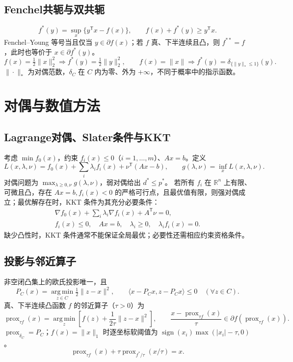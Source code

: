 \documentclass[../main.tex]{subfiles}
\begin{document}
\subsection{Fenchel共轭与双共轭}
\[
f^*(y)=\sup_x\{y^{\mathsf T}x-f(x)\},\qquad
f(x)+f^*(y)\ge y^{\mathsf T}x.
\]
Fenchel--Young 等号当且仅当 $y\in\partial f(x)$；若 $f$ 真、下半连续且凸，则 $f^{**}=f$，此时也等价于 $x\in\partial f^*(y)$。
\[
f(x)=\tfrac12\|x\|_2^2\Longrightarrow f^*(y)=\tfrac12\|y\|_2^2,\qquad
f(x)=\|x\|\Longrightarrow f^*(y)=\delta_{\{\|y\|_*\le1\}}(y).
\]
$\|\cdot\|_*$ 为对偶范数，$\delta_C$ 在 $C$ 内为零、外为 $+\infty$，不同于概率中的指示函数。
\section{对偶与数值方法}
\subsection{Lagrange对偶、Slater条件与KKT}
考虑 $\min f_0(x)$，约束 $f_i(x)\le0$（$i=1,\ldots,m$）、$Ax=b$。定义
\[
L(x,\lambda,\nu)=f_0(x)+\sum_i\lambda_if_i(x)+\nu^{\mathsf T}(Ax-b),\qquad
g(\lambda,\nu)=\inf_x L(x,\lambda,\nu).
\]
对偶问题为 $\max_{\lambda\ge0,\nu}g(\lambda,\nu)$，弱对偶给出 $d^*\le p^*$。
若所有 $f_i$ 在 $\mathbb R^n$ 上有限、可微且凸，存在 $Ax=b,f_i(x)<0$ 的严格可行点，且最优值有限，则强对偶成立；最优解存在时，KKT 条件为其充分必要条件：
\begin{gather*}
\nabla f_0(x)+\sum_i\lambda_i\nabla f_i(x)+A^{\mathsf T}\nu=0,\\
f_i(x)\le0,\quad Ax=b,\quad\lambda_i\ge0,\quad\lambda_if_i(x)=0.
\end{gather*}
缺少凸性时，KKT 条件通常不能保证全局最优；必要性还需相应约束资格条件。
\subsection{投影与邻近算子}
非空闭凸集上的欧氏投影唯一，且
\[
P_C(x)=\operatorname*{arg\,min}_{z\in C}\tfrac12\|z-x\|^2,\qquad
\langle x-P_Cx,z-P_Cx\rangle\le0\quad(\forall z\in C).
\]
真、下半连续凸函数 $f$ 的邻近算子（$\tau>0$）为
\[
\operatorname{prox}_{\tau f}(x)=\operatorname*{arg\,min}_z
\left[f(z)+\frac1{2\tau}\|z-x\|^2\right],\qquad
\frac{x-\operatorname{prox}_{\tau f}(x)}\tau\in\partial f(\operatorname{prox}_{\tau f}(x)).
\]
$\operatorname{prox}_{\delta_C}=P_C$；$f(x)=\|x\|_1$ 时逐坐标软阈值为 $\operatorname{sign}(x_i)\max(|x_i|-\tau,0)$。
\[
\operatorname{prox}_{\tau f}(x)+\tau\operatorname{prox}_{f^*/\tau}(x/\tau)=x.
\]
\end{document}
